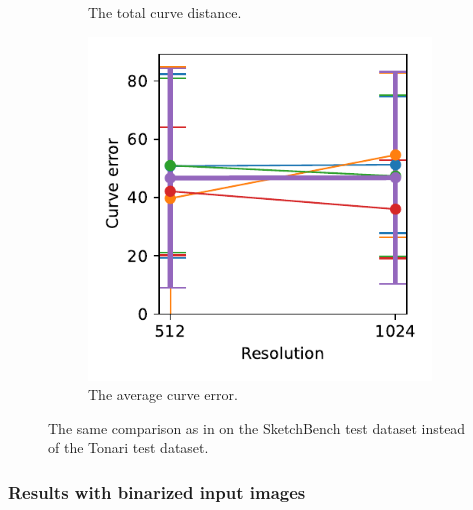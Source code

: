 \begin{figure}[!h]
\begin{subfigure}{.3\textwidth}
    \caption{The total curve distance.}
    \label{fig:curve_distance_res_sketchbench}
\end{subfigure}
    \begin{subfigure}{.3\textwidth}
    \centering
    \includegraphics[width=\textwidth]{graphics/eval/curve error_res_sketchbench.pdf}
    \caption{The average curve error.}
\end{subfigure}
    \caption{The same comparison as in  on the SketchBench test dataset instead of the Tonari test dataset.}
    \label{fig:res_comparison.sketchbench}
\end{figure}

\clearpage
\subsubsection{Results with binarized input images}
\label{subsec:eval.quant.True}

